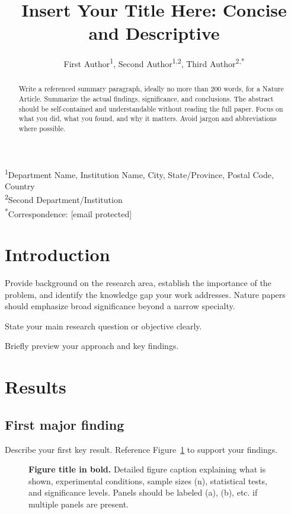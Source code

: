 \documentclass[12pt]{article}
\title{Insert Your Title Here: Concise and Descriptive}
\author{
First Author\textsuperscript{1}, Second Author\textsuperscript{1,2}, Third Author\textsuperscript{2,*}
}
\date{}
\begin{document}
\maketitle

\noindent
\textsuperscript{1}Department Name, Institution Name, City, State/Province, Postal Code, Country \\
\textsuperscript{2}Second Department/Institution \\
\textsuperscript{*}Correspondence: [email protected]

\begin{abstract}
\noindent
Write a referenced summary paragraph, ideally no more than 200 words, for a Nature Article. Summarize the actual findings, significance, and conclusions. The abstract should be self-contained and understandable without reading the full paper. Focus on what you did, what you found, and why it matters. Avoid jargon and abbreviations where possible.
\end{abstract}

\section*{Introduction}
Provide background on the research area, establish the importance of the problem, and identify the knowledge gap your work addresses. Nature papers should emphasize broad significance beyond a narrow specialty.

State your main research question or objective clearly.

Briefly preview your approach and key findings.

\section*{Results}

\subsection*{First major finding}
Describe your first key result. Reference Figure~\ref{fig:example} to support your findings.

\begin{figure}[ht]
\centering
\caption{{\bf Figure title in bold.} Detailed figure caption explaining what is shown, experimental conditions, sample sizes (n), statistical tests, and significance levels. Panels should be labeled (a), (b), etc. if multiple panels are present.}
\label{fig:example}
\end{figure}
\end{document}
